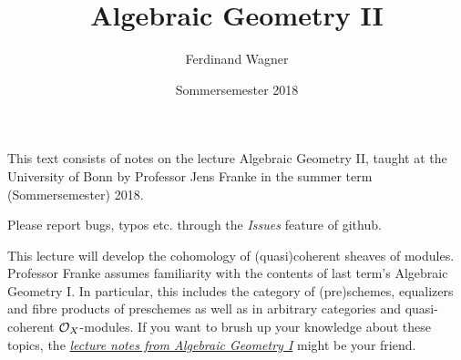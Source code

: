 \documentclass[a4paper,parskip=half,numbers=enddot, DIV=12]{scrreprt}
\title{Algebraic Geometry II}
\author{Ferdinand Wagner}
\date{Sommersemester 2018}
\begin{document}
\maketitle
{}

\thispagestyle{plain}
This text consists of notes on the lecture Algebraic Geometry II, taught at the University of Bonn by Professor Jens Franke in the summer term (Sommersemester) 2018. 

Please report bugs, typos etc. through the \emph{Issues} feature of github.

\tableofcontents

This lecture will develop the cohomology of (quasi)coherent sheaves of modules. Professor Franke assumes familiarity with the contents of last term's Algebraic Geometry I. In particular, this includes the category of (pre)schemes, equalizers and fibre products of preschemes as well as in arbitrary categories and quasi-coherent $\mathcal{O}_X$-modules. If you want to brush up your knowledge about these topics, the \href{https://github.com/Nicholas42/AlgebraFranke/tree/master/AlgGeoI}{\emph{lecture notes from Algebraic Geometry I}} \cite{alggeo1} might be your friend.
\end{document}
